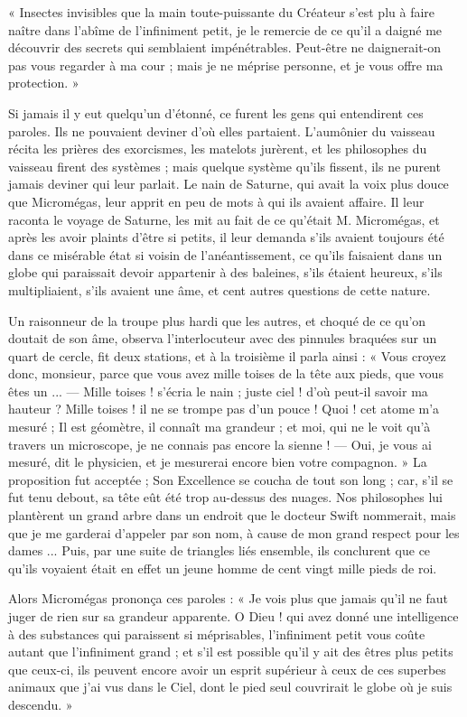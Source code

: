 \documentclass[a4paper, 11pt, oneside]{article}
\begin{document}
« Insectes invisibles que la main toute-puissante du Créateur s'est plu à faire naître dans l'abîme de l'infiniment petit, je le remercie de ce qu'il a daigné me découvrir des secrets qui semblaient impénétrables. Peut-être ne daignerait-on pas vous regarder à ma cour ; mais je ne méprise personne, et je vous offre ma protection. »

Si jamais il y eut quelqu'un d'étonné, ce furent les gens qui entendirent ces paroles. Ils ne pouvaient deviner d'où elles partaient. L'aumônier du vaisseau récita les prières des exorcismes, les matelots jurèrent, et les philosophes du vaisseau firent des systèmes ; mais quelque système qu'ils fissent, ils ne purent jamais deviner qui leur parlait. Le nain de Saturne, qui avait la voix plus douce que Micromégas, leur apprit en peu de mots à qui ils avaient affaire. Il leur raconta le voyage de Saturne, les mit au fait de ce qu'était M. Micromégas, et après les avoir plaints d'être si petits, il leur demanda s'ils avaient toujours été dans ce misérable état si voisin de l'anéantissement, ce qu'ils faisaient dans un globe qui paraissait devoir appartenir à des baleines, s'ils étaient heureux, s'ils multipliaient, s'ils avaient une âme, et cent autres questions de cette nature.

Un raisonneur de la troupe plus hardi que les autres, et choqué de ce qu'on doutait de son âme, observa l'interlocuteur avec des pinnules braquées sur un quart de cercle, fit deux stations, et à la troisième il parla ainsi : « Vous croyez donc, monsieur, parce que vous avez mille toises de la tête aux pieds, que vous êtes un ... --- Mille toises ! s'écria le nain ; juste ciel ! d'où peut-il savoir ma hauteur ? Mille toises ! il ne se trompe pas d'un pouce ! Quoi ! cet atome m'a mesuré ; Il est géomètre, il connaît ma grandeur ; et moi, qui ne le voit qu'à travers un microscope, je ne connais pas encore la sienne ! --- Oui, je vous ai mesuré, dit le physicien, et je mesurerai encore bien votre compagnon. » La proposition fut acceptée ; Son Excellence se coucha de tout son long ; car, s'il se fut tenu debout, sa tête eût été trop au-dessus des nuages. Nos philosophes lui plantèrent un grand arbre dans un endroit que le docteur Swift nommerait, mais que je me garderai d'appeler par son nom, à cause de mon grand respect pour les dames ... Puis, par une suite de triangles liés ensemble, ils conclurent que ce qu'ils voyaient était en effet un jeune homme de cent vingt mille pieds de roi.

Alors Micromégas prononça ces paroles : « Je vois plus que jamais qu'il ne faut juger de rien sur sa grandeur apparente. O Dieu ! qui avez donné une intelligence à des substances qui paraissent si méprisables, l'infiniment petit vous coûte autant que l'infiniment grand ; et s'il est possible qu'il y ait des êtres plus petits que ceux-ci, ils peuvent encore avoir un esprit supérieur à ceux de ces superbes animaux que j'ai vus dans le Ciel, dont le pied seul couvrirait le globe où je suis descendu. »
\end{document}
